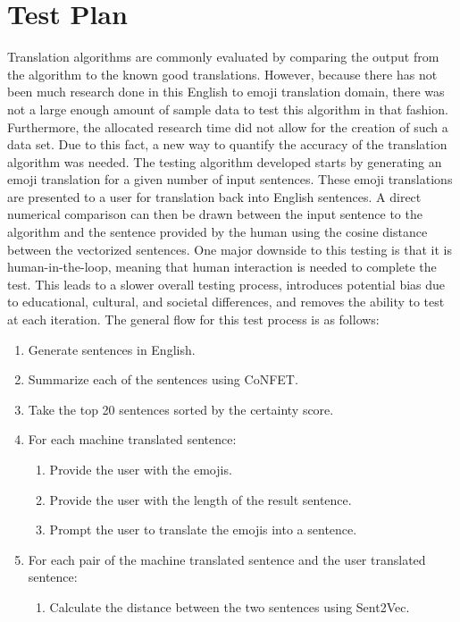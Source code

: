 \documentclass{article}[10]
\begin{document}
\section{Test Plan\label{sec:testPlan}}

Translation algorithms are commonly evaluated by comparing the output from the
algorithm to the known good translations. However, because there has not been
much research done in this English to emoji translation domain, there was not a
large enough amount of sample data to test this algorithm in that fashion.
Furthermore, the allocated research time did not allow for the creation of such
a data set. Due to this
fact, a new way to quantify the accuracy of the translation algorithm was
needed. The testing algorithm developed starts by generating an emoji
translation for a given number of input sentences. These emoji translations are
presented to a user for translation back into English sentences. A direct
numerical comparison can then be drawn between the input sentence to the
algorithm and the sentence provided by the human using the cosine distance
between the vectorized sentences. One major downside to this testing is that it
is human-in-the-loop, meaning that human interaction is needed to complete the
test. This leads to a slower overall testing process, introduces potential bias
due to educational, cultural, and societal differences, and removes the ability to
test at each iteration. The general flow for this test process is as follows:

\begin{enumerate}[label= (\arabic*)]
  \itemsep0em
  \item Generate sentences in English.
  \item Summarize each of the sentences using CoNFET\@.
  \item Take the top 20 sentences sorted by the certainty score.
  \item For each machine translated sentence:
    \begin{enumerate}[topsep=0pt]
      \itemsep0em
      \item Provide the user with the emojis.
      \item Provide the user with the length of the result sentence.
      \item Prompt the user to translate the emojis into a sentence.
    \end{enumerate}
  \item For each pair of the machine translated sentence and the user translated
    sentence:
    \begin{enumerate}[topsep=0pt]
      \itemsep0em
      \item Calculate the distance between the two sentences using Sent2Vec.
    \end{enumerate}
\end{enumerate}
\end{document}
